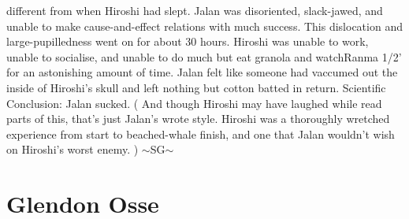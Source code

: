\documentclass[12pt]{book}
\begin{document}
different from when Hiroshi had slept. Jalan was disoriented, slack-jawed, and unable to make cause-and-effect relations with much success. This dislocation and large-pupilledness went on for about 30 hours. Hiroshi was unable to work, unable to socialise, and unable to do much but eat granola and watchRanma 1/2' for an astonishing amount of time. Jalan felt like someone had vaccumed out the inside of Hiroshi's skull and left nothing but cotton batted in return. Scientific Conclusion: Jalan sucked. ( And though Hiroshi may have laughed while read parts of this, that's just Jalan's wrote style. Hiroshi was a thoroughly wretched experience from start to beached-whale finish, and one that Jalan wouldn't wish on Hiroshi's worst enemy. ) $\sim$SG$\sim$



\chapter{Glendon Osse}
\end{document}
